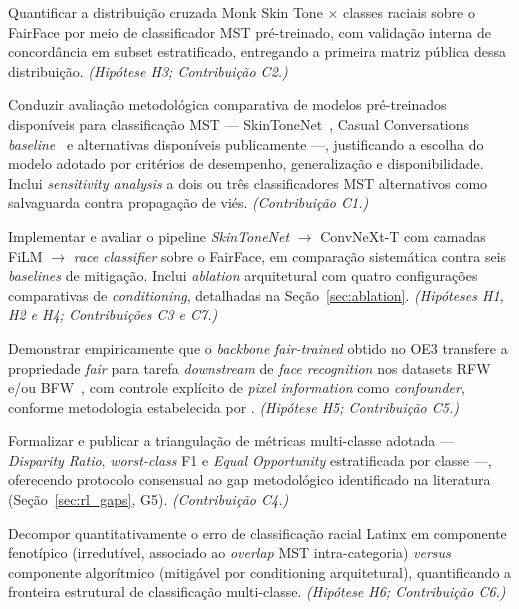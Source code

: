 \begin{description}[font=\bfseries\sffamily]
\item[OE1.] Quantificar a distribuição cruzada Monk Skin Tone $\times$ classes raciais sobre o FairFace por meio de classificador MST pré-treinado, com validação interna de concordância em subset estratificado, entregando a primeira matriz pública dessa distribuição. \textit{(Hipótese H3; Contribuição C2.)}

\item[OE2.] Conduzir avaliação metodológica comparativa de modelos pré-treinados disponíveis para classificação MST --- SkinToneNet~\cite{matias2026large}, Casual Conversations \emph{baseline}~\cite{hazirbas2021towards,porgali2023casual} e alternativas disponíveis publicamente ---, justificando a escolha do modelo adotado por critérios de desempenho, generalização e disponibilidade. Inclui \emph{sensitivity analysis} a dois ou três classificadores MST alternativos como salvaguarda contra propagação de viés. \textit{(Contribuição C1.)}

\item[OE3.] Implementar e avaliar o pipeline \emph{SkinToneNet} $\rightarrow$ ConvNeXt-T com camadas FiLM $\rightarrow$ \emph{race classifier} sobre o FairFace, em comparação sistemática contra seis \emph{baselines} de mitigação. Inclui \emph{ablation} arquitetural com quatro configurações comparativas de \emph{conditioning}, detalhadas na Seção~\ref{sec:ablation}. \textit{(Hipóteses H1, H2 e H4; Contribuições C3 e C7.)}

\item[OE4.] Demonstrar empiricamente que o \emph{backbone} \emph{fair-trained} obtido no OE3 transfere a propriedade \emph{fair} para tarefa \emph{downstream} de \emph{face recognition} nos datasets RFW~\cite{wang2019racial} e/ou BFW~\cite{robinson2020face}, com controle explícito de \emph{pixel information} como \emph{confounder}, conforme metodologia estabelecida por . \textit{(Hipótese H5; Contribuição C5.)}

\item[OE5.] Formalizar e publicar a triangulação de métricas multi-classe adotada --- \emph{Disparity Ratio}, \emph{worst-class} F1 e \emph{Equal Opportunity} estratificada por classe ---, oferecendo protocolo consensual ao gap metodológico identificado na literatura (Seção~\ref{sec:rl_gaps}, G5). \textit{(Contribuição C4.)}

\item[OE6.] Decompor quantitativamente o erro de classificação racial Latinx em componente fenotípico (irredutível, associado ao \emph{overlap} MST intra-categoria) \emph{versus} componente algorítmico (mitigável por conditioning arquitetural), quantificando a fronteira estrutural de classificação multi-classe. \textit{(Hipótese H6; Contribuição C6.)}
\end{description}

